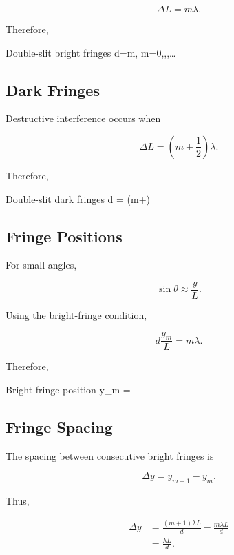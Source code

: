 \documentclass{studentnotes}
\begin{document}
\[
    \Delta L=m\lambda.
\]

Therefore,

\begin{namedformula}{Double-slit bright fringes}
    d\sin\theta=m\lambda,
    \qquad
    m=0,,,\ldots
\end{namedformula}

\subsection{Dark Fringes}

Destructive interference occurs when

\[
    \Delta L
    =
    \left(m+\frac12\right)\lambda.
\]

Therefore,

\begin{namedformula}{Double-slit dark fringes}
    d\sin\theta%
    =
    \left(m+\right)\lambda%
\end{namedformula}

\subsection{Fringe Positions}

For small angles,

\[
    \sin\theta\approx\frac{y}{L}.
\]

Using the bright-fringe condition,

\[
    d\frac{y_m}{L}=m\lambda.
\]

Therefore,

\begin{namedformula}{Bright-fringe position}
    y_m
    =
\end{namedformula}

\subsection{Fringe Spacing}

The spacing between consecutive bright fringes is

\[
    \Delta y
    =
    y_{m+1}-y_m.
\]

Thus,

\[
    \begin{aligned}
        \Delta y
         & =
        \frac{(m+1)\lambda L}{d}
        -
        \frac{m\lambda L}{d} \\
         & =
        \frac{\lambda L}{d}.
    \end{aligned}
\]
\end{document}
